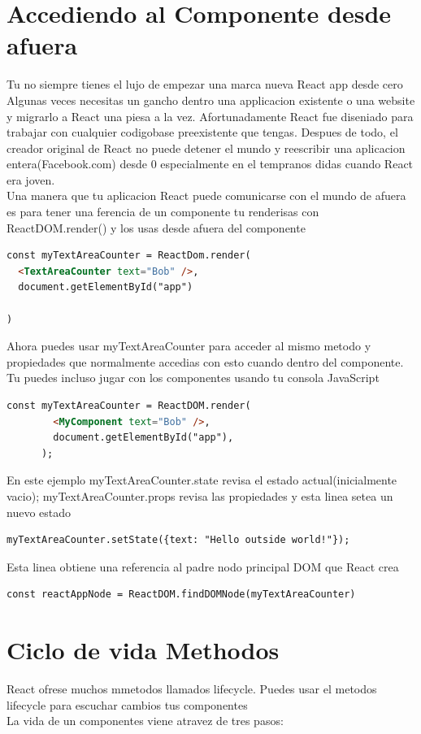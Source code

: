 \section{Accediendo al Componente desde afuera}
Tu no siempre tienes el lujo de empezar una marca nueva React app desde cero \\
Algunas veces necesitas un gancho dentro una applicacion existente o una website y migrarlo a React una piesa a la vez. Afortunadamente React fue diseniado para trabajar con cualquier codigobase preexistente que tengas. Despues de todo, el creador original de React no puede detener el mundo y reescribir una aplicacion entera(Facebook.com) desde 0 especialmente en el tempranos didas cuando React era joven.\\
Una manera que tu aplicacion React puede comunicarse con el mundo de afuera es para tener una ferencia de un componente tu renderisas con ReactDOM.render() y los usas desde afuera del componente
\begin{lstlisting}[language=html]
const myTextAreaCounter = ReactDom.render(
  <TextAreaCounter text="Bob" />,
  document.getElementById("app")

)
\end{lstlisting}
Ahora puedes usar myTextAreaCounter para acceder al mismo metodo y propiedades que normalmente accedias con esto cuando dentro del componente. Tu puedes incluso jugar con los componentes usando tu consola JavaScript
\begin{lstlisting}[language=html]
      const myTextAreaCounter = ReactDOM.render(
        <MyComponent text="Bob" />,
        document.getElementById("app"),
      );
\end{lstlisting}
En este ejemplo myTextAreaCounter.state revisa el estado actual(inicialmente vacio); myTextAreaCounter.props revisa las propiedades y esta linea setea un nuevo estado\\
\begin{lstlisting}[language=html]
myTextAreaCounter.setState({text: "Hello outside world!"});
\end{lstlisting}
Esta linea obtiene una referencia al padre nodo principal DOM que React crea
\begin{lstlisting}[language=html]
const reactAppNode = ReactDOM.findDOMNode(myTextAreaCounter)
\end{lstlisting}
\section{Ciclo de vida Methodos}
React ofrese muchos mmetodos llamados lifecycle. Puedes usar el metodos lifecycle para escuchar cambios  tus componentes\\
La vida de un componentes viene atravez de tres pasos:

